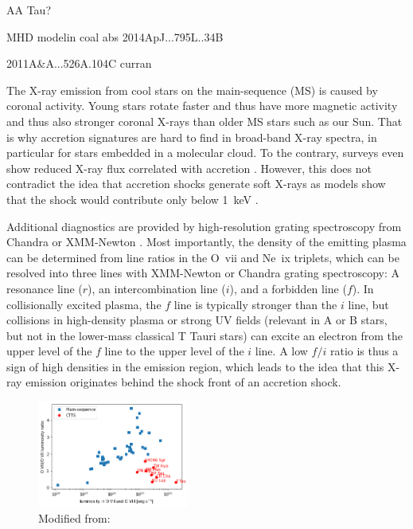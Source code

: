 AA Tau?

MHD modelin coal abs 2014ApJ...795L..34B 

2011A&A...526A.104C curran



The X-ray emission from cool stars on the main-sequence (MS) is caused by coronal activity. Young stars rotate faster and thus have more magnetic activity and thus also stronger coronal X-rays than older MS stars such as our Sun. That is why accretion signatures are hard to find in broad-band X-ray spectra, in particular for stars embedded in a molecular cloud. To the contrary, surveys even show reduced X-ray flux correlated with accretion \cite{2005ApJS..160..401P}. However, this does not contradict the idea that accretion shocks generate soft X-rays as models show that the shock would contribute only below 1~keV \cite{1999AstL...25..430L}.

Additional diagnostics are provided by high-resolution grating spectroscopy from Chandra or XMM-Newton \cite{Kastner_2002}. Most importantly, the density of the emitting plasma can be determined from line ratios in the O~{\sc vii} and Ne~{\sc ix} triplets, which can be resolved into three lines with XMM-Newton or Chandra grating spectroscopy: A resonance line ($r$), an intercombination line ($i$), and a forbidden line ($f$). In collisionally excited plasma, the $f$ line is typically stronger than the $i$ line, but collisions in high-density plasma or strong UV fields (relevant in A or B stars, but not in the lower-mass classical T Tauri stars) can excite an electron from the upper level of the $f$ line to the upper level of the $i$ line. A low $f/i$ ratio is thus a sign of high densities in the emission region, which leads to the idea that this X-ray emission originates behind the shock front of an accretion shock.

\begin{figure}[t]
\centering
\includegraphics[width=5cm]{figs/o72o8.png}
\caption{ Modified from:  \cite{2013ApJ...771...70G} \label{fig:softexcess}}
\end{figure}

